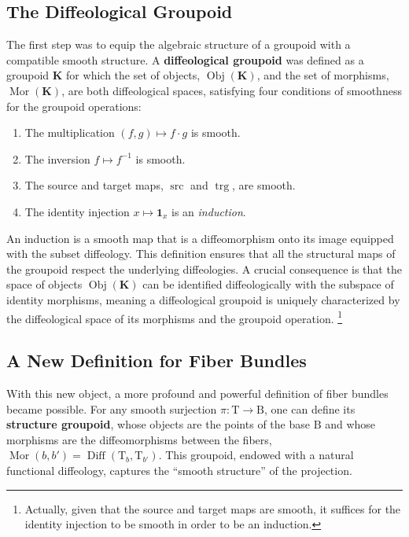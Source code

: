 \documentclass[10pt,reqno,letterpaper,twoside]{amsart}
\theoremstyle{article}
\newcommand{\KK}{\mathbf{K}}
\def \B{\mathrm B}
\def \T{\mathrm T}
\DeclareMathOperator{\Diff}{Diff}
\newcommand{\id}{\mathbf 1}
\newcommand{\Obj}{\operatorname{Obj}}
\newcommand{\Mor}{\operatorname{Mor}}
\newcommand{\source}{\operatorname{src}}
\newcommand{\target}{\operatorname{trg}}
\begin{document}
  \subsection{The Diffeological Groupoid}
  
  The first step was to equip the algebraic structure of a groupoid with a compatible smooth structure.
  A \textbf{diffeological groupoid} was defined as a groupoid $\KK$ for which the set of objects,
  $\Obj(\KK)$,
  and the set of morphisms,
  $\Mor(\KK)$, are both diffeological spaces, satisfying four conditions of smoothness for the groupoid operations:
  \begin{enumerate}
    \item The multiplication $(f,g) \mapsto f \cdot g$ is smooth.
    \item The inversion $f \mapsto f^{-1}$ is smooth.
    \item The source and target maps, $\source$ and $\target$, are smooth.
    \item The identity injection $x \mapsto \id_x$ is an \emph{induction}.
  \end{enumerate}
  An induction is a smooth map that is a diffeomorphism onto its image equipped with the subset diffeology.
  This definition ensures that all the structural maps of the groupoid respect the underlying diffeologies.
  A crucial consequence is that the space of objects $\Obj(\KK)$ can be identified diffeologically with the subspace of identity morphisms,
  meaning a diffeological groupoid is uniquely characterized by the diffeological space of its morphisms and the groupoid operation.%
  \footnote{Actually,
  given that the source and target maps are smooth,
  it suffices for the identity injection to be smooth in order to be an induction.}
  
  \subsection{A New Definition for Fiber Bundles}
  
  With this new object, a more profound and powerful definition of fiber bundles became possible.
  For any smooth surjection $\pi : \T \to \B$,
  one can define its \textbf{structure groupoid},
  whose objects are the points of the base $\B$ and whose morphisms are the diffeomorphisms between the fibers,
  $\Mor(b, b') = \Diff(\T_b, \T_{b'})$.
  This groupoid,
  endowed with a natural functional diffeology,
  captures the ``smooth structure'' of the projection.
  
\end{document}
